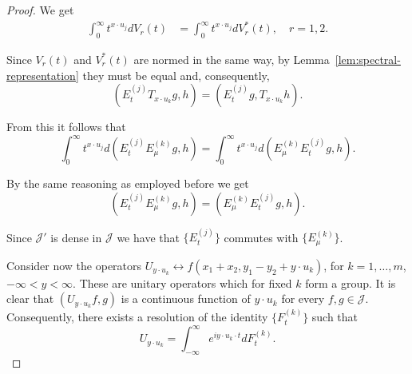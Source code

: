 \documentclass{article}
\begin{document}
\begin{proof}
We get
\begin{align}
\int_0^{\infty} t^{x \cdot u_j} dV_r(t) &= \int_0^{\infty} t^{x \cdot u_j} dV_r^*(t), \quad r = 1, 2.
\label{eq:integral-equality}
\end{align}

Since $V_r(t)$ and $V_r^*(t)$ are normed in the same way, by Lemma~\ref{lem:spectral-representation} they must be equal and, consequently,
\begin{equation}
(E_t^{(j)} T_{x \cdot u_k} g, h) = (E_t^{(j)} g, T_{x \cdot u_k} h).
\label{eq:commutation-result}
\end{equation}

From this it follows that
\begin{equation}
\int_0^{\infty} t^{x \cdot u_j} d(E_t^{(j)} E_{\mu}^{(k)} g, h) = \int_0^{\infty} t^{x \cdot u_j} d(E_{\mu}^{(k)} E_t^{(j)} g, h).
\label{eq:spectral-commutation}
\end{equation}

By the same reasoning as employed before we get
\begin{equation}
(E_t^{(j)} E_{\mu}^{(k)} g, h) = (E_{\mu}^{(k)} E_t^{(j)} g, h).
\label{eq:projections-commute}
\end{equation}

Since $\mathcal{J}'$ is dense in $\mathcal{J}$ we have that $\{E_t^{(j)}\}$ commutes with $\{E_{\mu}^{(k)}\}$.

Consider now the operators $U_{y \cdot u_k} \leftrightarrow f(x_1 + x_2, y_1 - y_2 + y \cdot u_k)$, for $k = 1, \ldots, m$, $-\infty < y < \infty$. These are unitary operators which for fixed $k$ form a group. It is clear that $(U_{y \cdot u_k} f, g)$ is a continuous function of $y \cdot u_k$ for every $f, g \in \mathcal{J}$. Consequently, there exists a resolution of the identity $\{F_t^{(k)}\}$ such that
\begin{equation}
U_{y \cdot u_k} = \int_{-\infty}^{\infty} e^{i y \cdot u_k \cdot t} dF_t^{(k)}.
\label{eq:unitary-representation}
\end{equation}


\end{proof}
\end{document}
